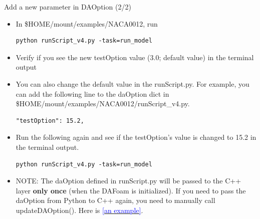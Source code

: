 \documentclass{bredelebeamer}
\begin{document}
\begin{frame}[fragile]{Add a new parameter in DAOption (2/2)}

\begin{itemize}
 \item In \$HOME/mount/examples/NACA0012, run
\begin{lstlisting}
python runScript_v4.py -task=run_model
\end{lstlisting}
  \item Verify if you see the new testOption value (3.0; default value) in the terminal output
  \item You can also change the default value in the runScript.py. For example, you can add the following line to the daOption dict in \$HOME/mount/examples/NACA0012/runScript\_v4.py.
 \begin{lstlisting}
"testOption": 15.2,
 \end{lstlisting}
\item Run the following again and see if the testOption's value is changed to 15.2 in the terminal output.
\begin{lstlisting}
python runScript_v4.py -task=run_model
\end{lstlisting}
\item NOTE: The daOption defined in runScript.py will be passed to the C++ layer \textbf{only once} (when the DAFoam is initialized). If you need to pass the daOption from Python to C++ again, you need to manually call updateDAOption(). Here is \href{https://github.com/mdolab/dafoam/blob/27d7279e32e62fa2c65399f3441836aefc8401c5/dafoam/pyDAFoam.py#L825}{\textcolor{blue}{[an example]}}.
\end{itemize}

\end{frame}
\end{document}
